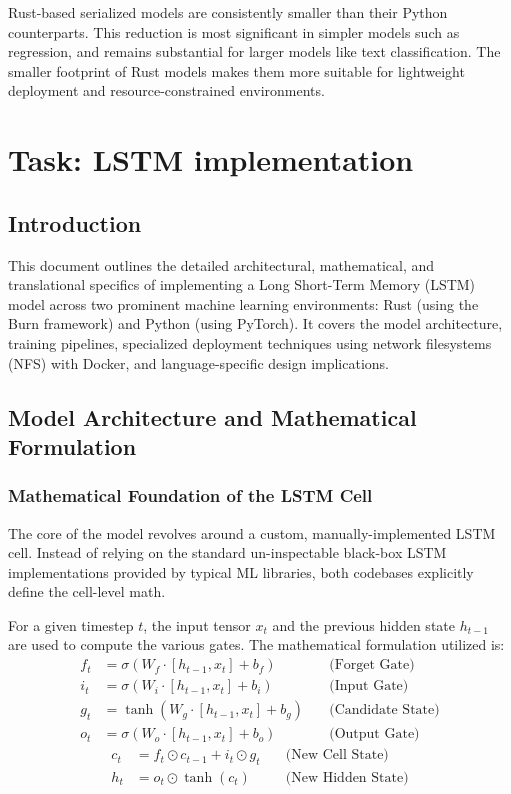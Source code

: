 \documentclass{ieeeaccess}
\begin{document}
\noindent
Rust-based serialized models are consistently smaller than their Python counterparts. This reduction is most significant in simpler models such as regression, and remains substantial for larger models like text classification. The smaller footprint of Rust models makes them more suitable for lightweight deployment and resource-constrained environments.

\clearpage

\section{Task: LSTM implementation}
\newpage

\subsection{Introduction}
This document outlines the detailed architectural, mathematical, and translational specifics of implementing a Long Short-Term Memory (LSTM) model across two prominent machine learning environments: Rust (using the Burn framework) and Python (using PyTorch). It covers the model architecture, training pipelines, specialized deployment techniques using network filesystems (NFS) with Docker, and language-specific design implications.

\subsection{Model Architecture and Mathematical Formulation}

\subsubsection{Mathematical Foundation of the LSTM Cell}
The core of the model revolves around a custom, manually-implemented LSTM cell. Instead of relying on the standard un-inspectable black-box LSTM implementations provided by typical ML libraries, both codebases explicitly define the cell-level math. 

For a given timestep $t$, the input tensor $x_t$ and the previous hidden state $h_{t-1}$ are used to compute the various gates. The mathematical formulation utilized is:
\begin{align}
    f_t &= \sigma(W_f \cdot [h_{t-1}, x_t] + b_f) \quad &\text{(Forget Gate)} \\
    i_t &= \sigma(W_i \cdot [h_{t-1}, x_t] + b_i) \quad &\text{(Input Gate)} \\
    g_t &= \tanh(W_g \cdot [h_{t-1}, x_t] + b_g) \quad &\text{(Candidate State)} \\
    o_t &= \sigma(W_o \cdot [h_{t-1}, x_t] + b_o) \quad &\text{(Output Gate)}
\end{align}
\begin{align}
    c_t &= f_t \odot c_{t-1} + i_t \odot g_t \quad &\text{(New Cell State)} \\
    h_t &= o_t \odot \tanh(c_t) \quad &\text{(New Hidden State)}
\end{align}
\end{document}
